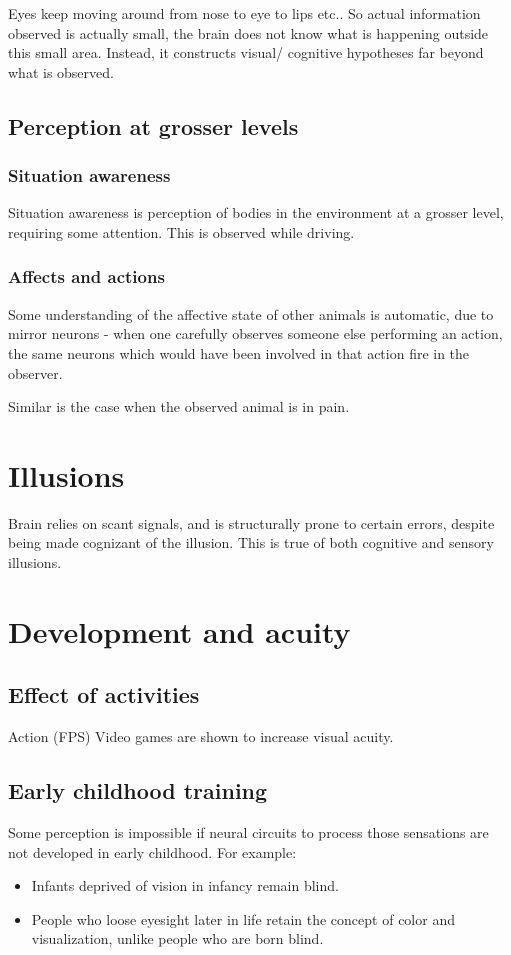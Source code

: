 \documentclass[oneside, article]{memoir}
\begin{document}
Eyes keep moving around from nose to eye to lips etc.. So actual information observed is actually small, the brain does not know what is happening outside this small area. Instead, it constructs visual/ cognitive hypotheses far beyond what is observed.

\subsection{Perception at grosser levels}
\subsubsection{Situation awareness}
Situation awareness is perception of bodies in the environment at a grosser level, requiring some attention. This is observed while driving.

\subsubsection{Affects and actions}
Some understanding of the affective state of other animals is automatic, due to mirror neurons - when one carefully observes someone else performing an action, the same neurons which would have been involved in that action fire in the observer.

Similar is the case when the observed animal is in pain.

\section{Illusions}
Brain relies on scant signals, and is structurally prone to certain errors, despite being made cognizant of the illusion. This is true of both cognitive and sensory illusions.

\section{Development and acuity}
\subsection{Effect of activities}
Action (FPS) Video games are shown to increase visual acuity.

\subsection{Early childhood training}
Some perception is impossible if neural circuits to process those sensations are not developed in early childhood. For example:
\begin{itemize}
\item Infants deprived of vision in infancy remain blind.
\item People who loose eyesight later in life retain the concept of color and visualization, unlike people who are born blind. \chk
\end{itemize}
\end{document}
